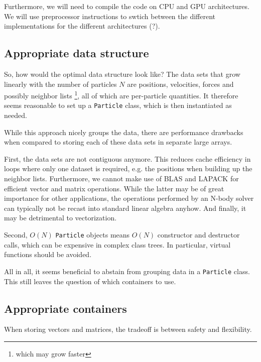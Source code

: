 \documentclass{scrartcl}
\begin{document}
Furthermore, we will need to compile the code on CPU and GPU architectures. 
We will use preprocessor instructions to swtich between the different
implementations for the different architectures (?).

\subsection{Appropriate data structure}
So, how would the optimal data structure look like?
The data sets that grow linearly with the number of particles $N$
are positions, velocities, forces and possibly neighbor lists%
\footnote{which may grow faster}, 
all of which are per-particle quantities.
It therefore seems reasonable to set up a
\verb|Particle| class, which is then instantiated as needed.

While this approach nicely groups the data,
there are performance drawbacks when compared to
storing each of these data sets in separate large arrays.

First, the data sets are not contiguous anymore.
This reduces cache efficiency in loops where only one 
dataset is required, e.g. the positions when building up
the neighbor lists.
Furthermore, we cannot make use of BLAS and LAPACK for efficient
vector and matrix operations. 
While the latter may be of great importance for other applications,
the operations performed by an N-body solver can typically not be recast
into standard linear algebra anyhow.
And finally, it may be detrimental to vectorization.

Second, $O(N)$ \verb|Particle| objects means $O(N)$ constructor
and destructor calls, which can be expensive in complex class trees.
In particular, virtual functions should be avoided.

All in all, it seems beneficial to abstain from 
grouping data in a \verb|Particle| class.
This still leaves the question of which containers to use.

\subsection{Appropriate containers}

When storing vectors and matrices, the tradeoff is between safety and
flexibility.
\end{document}
